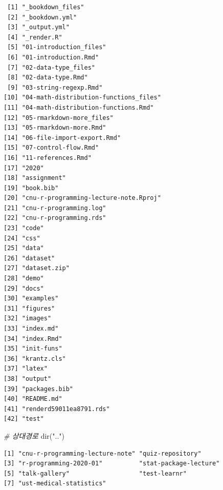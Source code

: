 \documentclass[
  11pt,
]{krantz}
\newenvironment{Shaded}{\begin{snugshade}}{\end{snugshade}}
\newcommand{\CommentTok}[1]{\textcolor[rgb]{0.37,0.37,0.37}{\textit{#1}}}
\newcommand{\FunctionTok}[1]{\textcolor[rgb]{0,0,0}{#1}}
\newcommand{\NormalTok}[1]{#1}
\newcommand{\StringTok}[1]{\textcolor[rgb]{0.5,0.5,0.5}{#1}}
\begin{document}
\begin{verbatim}
 [1] "_bookdown_files"                     
 [2] "_bookdown.yml"                       
 [3] "_output.yml"                         
 [4] "_render.R"                           
 [5] "01-introduction_files"               
 [6] "01-introduction.Rmd"                 
 [7] "02-data-type_files"                  
 [8] "02-data-type.Rmd"                    
 [9] "03-string-regexp.Rmd"                
[10] "04-math-distribution-functions_files"
[11] "04-math-distribution-functions.Rmd"  
[12] "05-rmarkdown-more_files"             
[13] "05-rmarkdown-more.Rmd"               
[14] "06-file-import-export.Rmd"           
[15] "07-control-flow.Rmd"                 
[16] "11-references.Rmd"                   
[17] "2020"                                
[18] "assignment"                          
[19] "book.bib"                            
[20] "cnu-r-programming-lecture-note.Rproj"
[21] "cnu-r-programming.log"               
[22] "cnu-r-programming.rds"               
[23] "code"                                
[24] "css"                                 
[25] "data"                                
[26] "dataset"                             
[27] "dataset.zip"                         
[28] "demo"                                
[29] "docs"                                
[30] "examples"                            
[31] "figures"                             
[32] "images"                              
[33] "index.md"                            
[34] "index.Rmd"                           
[35] "init-funs"                           
[36] "krantz.cls"                          
[37] "latex"                               
[38] "output"                              
[39] "packages.bib"                        
[40] "README.md"                           
[41] "renderd59011ea8791.rds"              
[42] "test"                                
\end{verbatim}

\begin{Shaded}
\begin{Highlighting}[]
\CommentTok{\# 상대경로}
\FunctionTok{dir}\NormalTok{(}\StringTok{".."}\NormalTok{) }
\end{Highlighting}
\end{Shaded}

\begin{verbatim}
[1] "cnu-r-programming-lecture-note" "quiz-repository"               
[3] "r-programming-2020-01"          "stat-package-lecture"          
[5] "talk-gallery"                   "test-learnr"                   
[7] "ust-medical-statistics"        
\end{verbatim}
\end{document}
